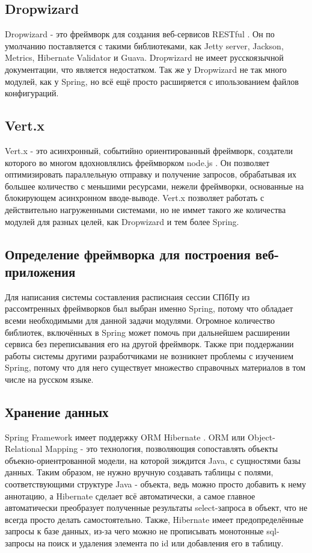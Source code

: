 \subsection{Dropwizard}
Dropwizard - это фреймворк для создания веб-сервисов RESTful \cite{dropwizard}. Он по умолчанию поставляется с такими библиотеками, как Jetty server, Jackson, Metrics, Hibernate Validator и Guava. Dropwizard не имеет русскоязычной документации, что является недостатком. Так же у Dropwizard не так много модулей, как у Spring, но всё ещё просто расширяется с ипользованием файлов конфигураций.

\subsection{Vert.x}
Vert.x - это асинхронный, событийно ориентированный фреймворк, создатели которого во многом вдохновлялись фреймворком node.js \cite{vertx}. Он позволяет оптимизировать параллельную отправку и получение запросов, обрабатывая их большее количество с меньшими ресурсами, нежели фреймворки, основанные на блокирующем асинхронном вводе-выводе. Vert.x позволяет работать с действительно нагруженными системами, но не иммет такого же количества модулей для разных целей, как Dropwizard и тем более Spring.

\subsection{Определение фреймворка для построения веб-приложения} 
Для написания системы составления расписнаия сессии СПбПу из рассомтренных фреймворков был выбран именно Spring, потому что обладает всеми необходимыми для данной задачи модулями. Огромное количество библиотек, включённых в Spring может помочь при дальнейшем расширении сервиса без переписывания его на другой фреймворк. Также при поддержании работы системы другими разработчиками не возникнет проблемы с изучением Spring, потому что для него существует множество справочных материалов в том числе на русском языке.

\subsection{Хранение данных}
Spring Framework имеет поддержку ORM Hibernate \cite{hibernate}. ORM или Object-Relational Mapping - это технология, позволяющия сопоставлять объекты объекно-ориентрованной модели, на которой зиждится Java, с сущностями базы данных. Таким образом, не нужно вручную создавать таблицы с полями, соответствующими структуре Java - объекта, ведь можно просто добавить к нему аннотацию, а Hibernate сделает всё автоматически, а самое главное автоматически преобразует полученные результаты select-запроса в объект, что не всегда просто делать самостоятельно. Также, Hibernate имеет предопределённые запросы к базе данных, из-за чего можно не прописывать монотонные sql-запросы на поиск и удаления элемента по id или добавления его в таблицу.

